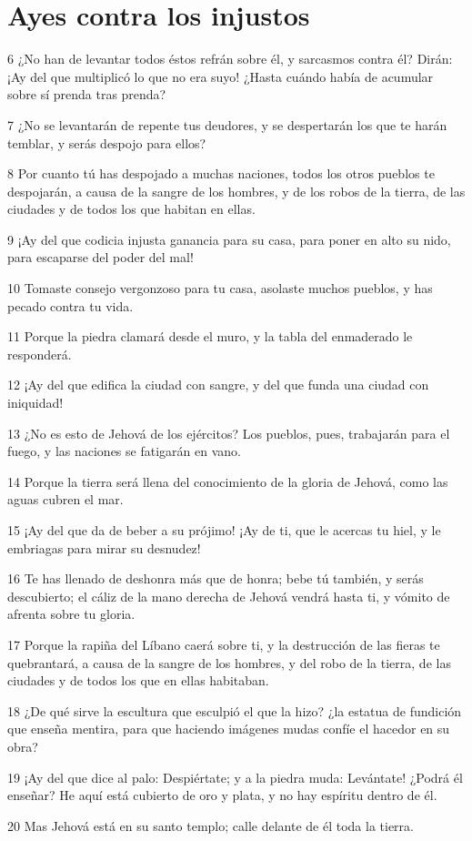 \section*{Ayes contra los injustos}

\par 6 ¿No han de levantar todos éstos refrán sobre él, y sarcasmos contra él? Dirán: ¡Ay del que multiplicó lo que no era suyo! ¿Hasta cuándo había de acumular sobre sí prenda tras prenda?
\par 7 ¿No se levantarán de repente tus deudores, y se despertarán los que te harán temblar, y serás despojo para ellos?
\par 8 Por cuanto tú has despojado a muchas naciones, todos los otros pueblos te despojarán, a causa de la sangre de los hombres, y de los robos de la tierra, de las ciudades y de todos los que habitan en ellas.
\par 9 ¡Ay del que codicia injusta ganancia para su casa, para poner en alto su nido, para escaparse del poder del mal!
\par 10 Tomaste consejo vergonzoso para tu casa, asolaste muchos pueblos, y has pecado contra tu vida.
\par 11 Porque la piedra clamará desde el muro, y la tabla del enmaderado le responderá.
\par 12 ¡Ay del que edifica la ciudad con sangre, y del que funda una ciudad con iniquidad!
\par 13 ¿No es esto de Jehová de los ejércitos? Los pueblos, pues, trabajarán para el fuego, y las naciones se fatigarán en vano.
\par 14 Porque la tierra será llena del conocimiento de la gloria de Jehová, como las aguas cubren el mar. 
\par 15 ¡Ay del que da de beber a su prójimo! ¡Ay de ti, que le acercas tu hiel, y le embriagas para mirar su desnudez!
\par 16 Te has llenado de deshonra más que de honra; bebe tú también, y serás descubierto; el cáliz de la mano derecha de Jehová vendrá hasta ti, y vómito de afrenta sobre tu gloria.
\par 17 Porque la rapiña del Líbano caerá sobre ti, y la destrucción de las fieras te quebrantará, a causa de la sangre de los hombres, y del robo de la tierra, de las ciudades y de todos los que en ellas habitaban.
\par 18 ¿De qué sirve la escultura que esculpió el que la hizo? ¿la estatua de fundición que enseña mentira, para que haciendo imágenes mudas confíe el hacedor en su obra?
\par 19 ¡Ay del que dice al palo: Despiértate; y a la piedra muda: Levántate! ¿Podrá él enseñar? He aquí está cubierto de oro y plata, y no hay espíritu dentro de él.
\par 20 Mas Jehová está en su santo templo; calle delante de él toda la tierra.

